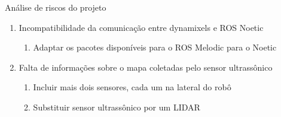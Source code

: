 \begin{frame}[t]{Análise de riscos do projeto} 
    \begin{enumerate}
        \item Incompatibilidade da comunicação entre dynamixels e ROS Noetic
        \begin{enumerate}
            \item Adaptar os pacotes disponíveis para o ROS Melodic para o Noetic
        \end{enumerate}   
        \item Falta de informações sobre o mapa coletadas pelo sensor ultrassônico 
        \begin{enumerate}
            \item Incluir mais dois sensores, cada um na lateral do robô
            \item Substituir sensor ultrassônico por um LIDAR
        \end{enumerate}  
    \end{enumerate}
    
\end{frame}
